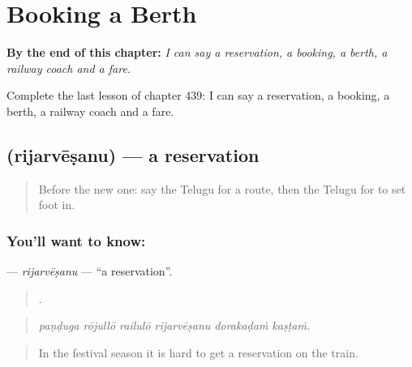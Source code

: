 
\chapter{Booking a Berth}
\label{ch:te-booking-a-berth}

\begin{chapteropening}
\textbf{By the end of this chapter:} \emph{I can say a reservation, a booking, a berth, a railway coach and a fare.}

Complete the last lesson of chapter 439: I can say a reservation, a booking, a berth, a railway coach and a fare.
\end{chapteropening}

\section[\texorpdfstring{\te{రిజర్వేషను} (rijarvēṣanu)}{రిజర్వేషను (rijarvēṣanu)}]{ (rijarvēṣanu) — a reservation}

\label{lesson:TE-C439-rijarvesanu}



\begin{quote}
Before the new one: say the Telugu for a route, then the Telugu for to set foot in.
\end{quote}

\subsection*{You'll want to know: }
\textbf{} — \emph{rijarvēṣanu} — \textquotedblleft{}a reservation\textquotedblright{}.

\begin{quote}
     .
\end{quote}

\begin{quote}
\emph{paṇḍuga rōjullō railulō rijarvēṣanu dorakaḍaṁ kaṣṭaṁ.}
\end{quote}

\begin{quote}
In the festival season it is hard to get a reservation on the train.
\end{quote}

